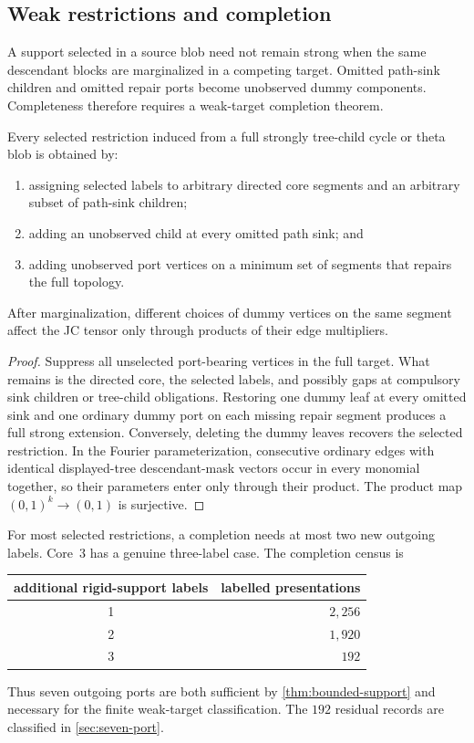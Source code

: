 \subsection{Weak restrictions and completion}

A support selected in a source blob need not remain strong when the same descendant blocks are marginalized in a competing target.  Omitted path-sink children and omitted repair ports become unobserved dummy components.  Completeness therefore requires a weak-target completion theorem.

\begin{lemma}\label{lem:weak-completion}
Every selected restriction induced from a full strongly tree-child cycle or theta blob is obtained by:
\begin{enumerate}[label=\textup{(\alph*)}]
\item assigning selected labels to arbitrary directed core segments and an arbitrary subset of path-sink children;
\item adding an unobserved child at every omitted path sink; and
\item adding unobserved port vertices on a minimum set of segments that repairs the full topology.
\end{enumerate}
After marginalization, different choices of dummy vertices on the same segment affect the JC tensor only through products of their edge multipliers.
\end{lemma}

\begin{proof}
Suppress all unselected port-bearing vertices in the full target.  What remains is the directed core, the selected labels, and possibly gaps at compulsory sink children or tree-child obligations.  Restoring one dummy leaf at every omitted sink and one ordinary dummy port on each missing repair segment produces a full strong extension.  Conversely, deleting the dummy leaves recovers the selected restriction.  In the Fourier parameterization, consecutive ordinary edges with identical displayed-tree descendant-mask vectors occur in every monomial together, so their parameters enter only through their product.  The product map $(0,1)^k\to(0,1)$ is surjective.
\end{proof}

For most selected restrictions, a completion needs at most two new outgoing labels.  Core~3 has a genuine three-label case.  The completion census is
\begin{center}
\begin{tabular}{c@{\qquad}r}
\toprule
additional rigid-support labels & labelled presentations\\
\midrule
1 & $2{,}256$\\
2 & $1{,}920$\\
3 & $192$\\
\bottomrule
\end{tabular}
\end{center}
Thus seven outgoing ports are both sufficient by \cref{thm:bounded-support} and necessary for the finite weak-target classification.  The $192$ residual records are classified in \cref{sec:seven-port}.
